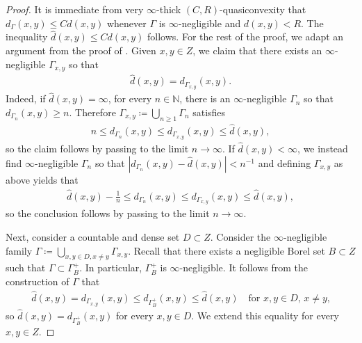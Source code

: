 \documentclass[reqno]{amsart}
\numberwithin{equation}{section}
\theoremstyle{remark}
\begin{document}
\begin{proof}
It is immediate from very $\infty$-thick $(C,R)$-quasiconvexity that $d_{\Gamma}(x,y) \leq Cd(x,y)$ whenever $\Gamma$ is $\infty$-negligible and $d(x,y) < R$. The inequality $\widehat{d}(x,y) \leq C d(x,y)$ follows. For the rest of the proof, we adapt an argument from the proof of \cite[Proposition 4.4]{Dur:Jar:Sha:19}. Given $x, y \in Z$, we claim that there exists an $\infty$-negligible $\Gamma_{x,y}$ so that
\begin{align*}
    \widehat{d}(x,y) = d_{ \Gamma_{x,y} }(x,y).
\end{align*}
Indeed, if $\widehat{d}(x,y) = \infty$, for every $n\in \mathbb{N}$, there is an $\infty$-negligible $\Gamma_n$ so that $d_{ \Gamma_n }(x,y) \geq n$. Therefore $\Gamma_{x,y} \coloneqq \bigcup_{ n \geq 1 } \Gamma_{n}$ satisfies
\begin{align*}
    n \leq d_{ \Gamma_n }(x,y) \leq d_{ \Gamma_{x,y} }(x,y) \leq \widehat{d}(x,y),
\end{align*}
so the claim follows by passing to the limit $n \rightarrow \infty$. If $\widehat{d}(x,y) < \infty$, we instead find $\infty$-negligible $\Gamma_n$ so that $| d_{\Gamma_n}(x,y) - \widehat{d}(x,y) | < n^{-1}$ and defining $\Gamma_{x,y}$ as above yields that
\begin{align*}
    \widehat{d}(x,y) - \frac{1}{n} \leq d_{ \Gamma_n }(x,y) \leq  d_{ \Gamma_{x,y} }(x,y) \leq \widehat{d}(x,y),
\end{align*}
so the conclusion follows by passing to the limit $n \rightarrow \infty$.

Next, consider a countable and dense set $D \subset Z$. Consider the $\infty$-negligible family $\Gamma \coloneqq \bigcup_{ x,y \in D, x \neq y } \Gamma_{x,y}$. Recall that there exists a negligible Borel set $B \subset Z$ such that $\Gamma \subset \Gamma^{+}_{B}$. In particular, $\Gamma^{+}_{B}$ is $\infty$-negligible. It follows from the construction of $\Gamma$ that
\begin{align*}
    \widehat{d}(x,y) = d_{ \Gamma_{x,y} }(x,y) \leq d_{\Gamma^{+}_{B}}(x,y) \leq \widehat{d}(x,y)
    \quad\text{for $x, y \in D$, $x \neq y$,}
\end{align*}
so $\widehat{d}(x,y) = d_{ \Gamma^{+}_{B} }(x,y)$ for every $x, y \in D$. We extend this equality for every $x, y \in Z$.


\end{proof}
\end{document}
